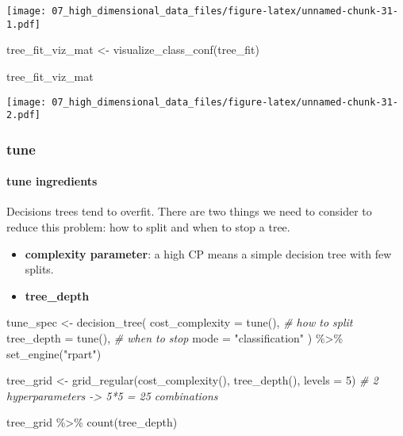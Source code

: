\documentclass[
]{book}
\newenvironment{Shaded}{\begin{snugshade}}{\end{snugshade}}
\newcommand{\AttributeTok}[1]{\textcolor[rgb]{0.77,0.63,0.00}{#1}}
\newcommand{\CommentTok}[1]{\textcolor[rgb]{0.56,0.35,0.01}{\textit{#1}}}
\newcommand{\DecValTok}[1]{\textcolor[rgb]{0.00,0.00,0.81}{#1}}
\newcommand{\FunctionTok}[1]{\textcolor[rgb]{0.00,0.00,0.00}{#1}}
\newcommand{\NormalTok}[1]{#1}
\newcommand{\OtherTok}[1]{\textcolor[rgb]{0.56,0.35,0.01}{#1}}
\newcommand{\SpecialCharTok}[1]{\textcolor[rgb]{0.00,0.00,0.00}{#1}}
\newcommand{\StringTok}[1]{\textcolor[rgb]{0.31,0.60,0.02}{#1}}
\begin{document}
\texttt{[image: 07\_high\_dimensional\_data\_files/figure-latex/unnamed-chunk-31-1.pdf]}

\begin{Shaded}
\begin{Highlighting}[]
\NormalTok{tree\_fit\_viz\_mat }\OtherTok{\textless{}{-}} \FunctionTok{visualize\_class\_conf}\NormalTok{(tree\_fit)}

\NormalTok{tree\_fit\_viz\_mat}
\end{Highlighting}
\end{Shaded}

\texttt{[image: 07\_high\_dimensional\_data\_files/figure-latex/unnamed-chunk-31-2.pdf]}

\hypertarget{tune-1}{%
\subsubsection{tune}\label{tune-1}}

\hypertarget{tune-ingredients-1}{%
\paragraph{tune ingredients}\label{tune-ingredients-1}}

Decisions trees tend to overfit. There are two things we need to consider to reduce this problem: how to split and when to stop a tree.

\begin{itemize}
\item
  \textbf{complexity parameter}: a high CP means a simple decision tree with few splits.
\item
  \textbf{tree\_depth}
\end{itemize}

\begin{Shaded}
\begin{Highlighting}[]
\NormalTok{tune\_spec }\OtherTok{\textless{}{-}} \FunctionTok{decision\_tree}\NormalTok{(}
    \AttributeTok{cost\_complexity =} \FunctionTok{tune}\NormalTok{(), }\CommentTok{\# how to split }
    \AttributeTok{tree\_depth =} \FunctionTok{tune}\NormalTok{(), }\CommentTok{\# when to stop }
    \AttributeTok{mode =} \StringTok{"classification"}
\NormalTok{  ) }\SpecialCharTok{\%\textgreater{}\%}
  \FunctionTok{set\_engine}\NormalTok{(}\StringTok{"rpart"}\NormalTok{)}

\NormalTok{tree\_grid }\OtherTok{\textless{}{-}} \FunctionTok{grid\_regular}\NormalTok{(}\FunctionTok{cost\_complexity}\NormalTok{(),}
                          \FunctionTok{tree\_depth}\NormalTok{(),}
                          \AttributeTok{levels =} \DecValTok{5}\NormalTok{) }\CommentTok{\# 2 hyperparameters {-}\textgreater{} 5*5 = 25 combinations }

\NormalTok{tree\_grid }\SpecialCharTok{\%\textgreater{}\%}
  \FunctionTok{count}\NormalTok{(tree\_depth)}
\end{Highlighting}
\end{Shaded}
\end{document}

